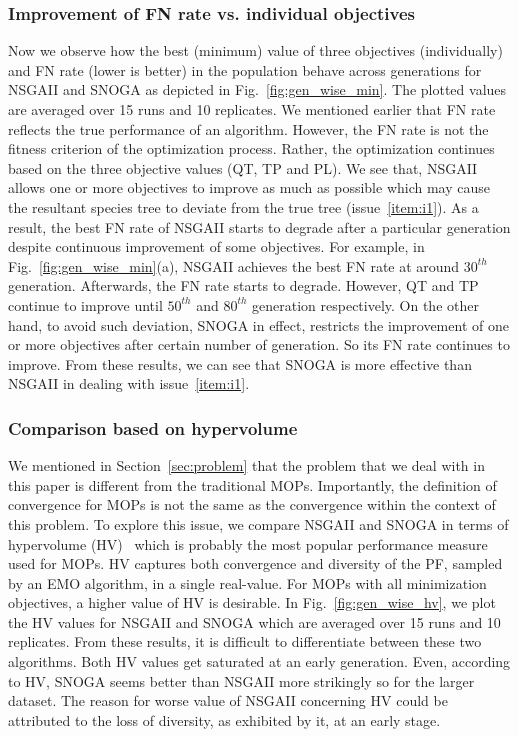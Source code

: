 \subsubsection{Improvement of FN rate vs. individual objectives} Now we observe how the best (minimum) value of three objectives (individually) and FN rate (lower is better) in the population behave across generations for NSGAII and SNOGA as depicted in Fig.~\ref{fig:gen_wise_min}. The plotted values are averaged over 15 runs and 10 replicates. We mentioned earlier that FN rate reflects the true performance of an algorithm. However, the FN rate is not the fitness criterion of the optimization process. Rather, the optimization continues based on the three objective values (QT, TP and PL).
We see that, NSGAII allows one or more objectives to improve as much as possible which may cause the resultant species tree to deviate from the true tree (issue~\ref{item:i1}). As a result, the best FN rate of NSGAII starts to degrade after a particular generation despite continuous improvement of some objectives. For example, in Fig.~\ref{fig:gen_wise_min}(a), NSGAII achieves the best FN rate at around $ 30^{th} $ generation. Afterwards, the FN rate starts to degrade. However, QT and TP continue to improve until $ 50^{th} $ and $ 80^{th} $ generation respectively.
On the other hand, to avoid such deviation, SNOGA in effect, restricts the improvement of one or more objectives after certain number of generation. So its FN rate continues to improve. From these results, we can see that SNOGA is more effective than NSGAII in dealing with issue~\ref{item:i1}.%


\subsubsection{Comparison based on hypervolume} We mentioned in Section~\ref{sec:problem} that the problem that we deal with in this paper is different from the traditional MOPs. Importantly, the definition of convergence for MOPs is not the same as the convergence within the context of this problem. To explore this issue, we compare NSGAII and SNOGA in terms of hypervolume (HV)~\cite{zitzler1999multiobjective} which is probably the most popular performance measure used for MOPs. HV captures both convergence and diversity of the PF, sampled by an EMO algorithm, in a single real-value. For MOPs with all minimization objectives, a higher value of HV is desirable. In Fig.~\ref{fig:gen_wise_hv}, we plot the HV values for NSGAII and SNOGA which are averaged over 15 runs and 10 replicates. From these results, it is difficult to differentiate between these two algorithms. Both HV values get saturated at an early generation. Even, according to HV, SNOGA seems better than NSGAII more strikingly so for the larger dataset. The reason for worse value of NSGAII concerning HV could be attributed to the loss of diversity, as exhibited by it, at an early stage. 

